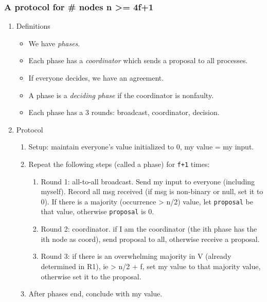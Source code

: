 \documentclass[11pt]{article}
\begin{document}
\subsubsection{A protocol for \# nodes n >= 4f+1}
\label{sec:orgaa3c626}
\begin{enumerate}
  \item Definitions
        \label{sec:orgd8bddc9}
        \begin{itemize}
          \item We have \emph{phases}.
          \item Each phase has a \emph{coordinator} which sends a proposal to all processes.
          \item If everyone decides, we have an agreement.
          \item A phase is a \emph{deciding phase} if the coordinator is nonfaulty.
          \item Each phase has a 3 rounds: broadcast, coordinator, decision.
        \end{itemize}
  \item Protocol
        \label{sec:orgb486711}
        \begin{enumerate}
          \item Setup: maintain everyone's value initialized to 0, my value = my input.
          \item Repeat the following steps (called a phase) for \texttt{f+1} times:
                \begin{enumerate}
                  \item Round 1: all-to-all broadcast. Send my input to everyone (including
                        myself). Record all msg received (if msg is non-binary or null, set it to
                        0). If there is a majority (occurrence > n/2) value, let \texttt{proposal} be that
                        value, otherwise \texttt{proposal} is 0.
                  \item Round 2: coordinator. if I am the coordinator (the ith phase has the ith node as
                        coord), send proposal to all, otherwise receive a proposal.
                  \item Round 3: if there is an overwhelming majority in V (already determined in
                        R1), ie > n/2 + f, set my value to that majority value, otherwise set it
                        to the proposal.
                \end{enumerate}
          \item After phases end, conclude with my value.

\end{enumerate}
\end{enumerate}
\end{document}

